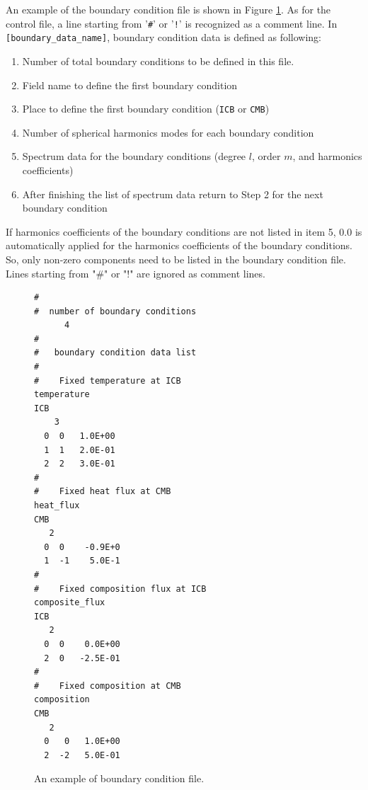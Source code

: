 An example of the boundary condition file is shown in Figure \ref{fig:boundary_file}. As for the control file, a line starting from '\verb|#|' or '\verb|!|' is recognized as a comment line. In \verb|[boundary_data_name]|, boundary condition data is defined as following:
%
\begin{enumerate}
\item  Number of total boundary conditions to be defined in this file.
\item  Field name to define the first boundary condition
\item  Place to define the first boundary condition (\verb|ICB| or \verb|CMB|)
\item  Number of spherical harmonics modes for each boundary condition
\item  Spectrum data for the boundary conditions (degree $l$, order $m$, and harmonics coefficients)
\item  After finishing the list of spectrum data return to Step 2 for the next boundary condition
\end{enumerate}
%
If harmonics coefficients of the boundary conditions are not listed in item 5, 0.0 is automatically applied for the harmonics coefficients of the boundary conditions. So, only non-zero components need to be listed in the boundary condition file. Lines starting from "\#" or "!" are ignored as comment lines.
%
\begin{figure}[htbp]
\begin{center}
{\small
\begin{verbatim}
#
#  number of boundary conditions
      4
#
#   boundary condition data list
#
#    Fixed temperature at ICB
temperature
ICB
    3
  0  0   1.0E+00
  1  1   2.0E-01
  2  2   3.0E-01
#
#    Fixed heat flux at CMB
heat_flux
CMB
   2
  0  0    -0.9E+0
  1  -1    5.0E-1
#
#    Fixed composition flux at ICB
composite_flux
ICB
   2
  0  0    0.0E+00
  2  0   -2.5E-01
#
#    Fixed composition at CMB
composition
CMB
   2
  0   0   1.0E+00
  2  -2   5.0E-01
\end{verbatim}
}
\end{center}
\caption{An example of boundary condition file.}
\label{fig:boundary_file}
\end{figure}
%
%
